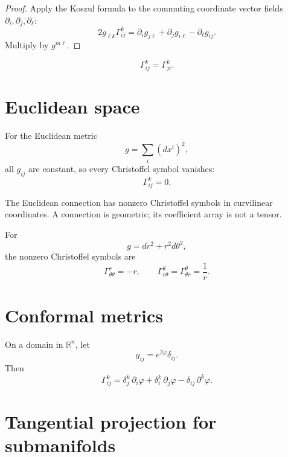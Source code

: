 \begin{proof}
Apply the Koszul formula to the commuting coordinate vector fields
\(\partial_i,\partial_j,\partial_\ell\):
\[
2g_{\ell k}\Gamma^k_{ij}
=
\partial_i g_{j\ell}
+\partial_j g_{i\ell}
-\partial_\ell g_{ij}.
\]
Multiply by \(g^{m\ell}\).
\end{proof}

\begin{corollary}[Symmetry]\label{cor:vii22-christoffel-symmetry}
\[
\Gamma^k_{ij}=\Gamma^k_{ji}.
\]
\end{corollary}

\section{Euclidean space}

\begin{example}\label{ex:vii22-cartesian}
For the Euclidean metric
\[
g=\sum_i (dx^i)^2,
\]
all \(g_{ij}\) are constant, so every Christoffel symbol vanishes:
\[
\Gamma^k_{ij}=0.
\]
\end{example}

\begin{warning}\label{warn:vii22-coordinates}
The Euclidean connection has nonzero Christoffel symbols in curvilinear
coordinates.  A connection is geometric; its coefficient array is not a tensor.
\end{warning}

\begin{example}\label{ex:vii22-polar}
For
\[
g=dr^2+r^2d\theta^2,
\]
the nonzero Christoffel symbols are
\[
\Gamma^r_{\theta\theta}=-r,
\qquad
\Gamma^\theta_{r\theta}
=
\Gamma^\theta_{\theta r}
=
\frac1r.
\]
\end{example}

\section{Conformal metrics}

\begin{example}\label{ex:vii22-conformal}
On a domain in \(\mathbb R^n\), let
\[
g_{ij}=e^{2\varphi}\delta_{ij}.
\]
Then
\[
\Gamma^k_{ij}
=
\delta^k_j\,\partial_i\varphi
+\delta^k_i\,\partial_j\varphi
-\delta_{ij}\,\partial^k\varphi.
\]
\end{example}

\section{Tangential projection for submanifolds}

